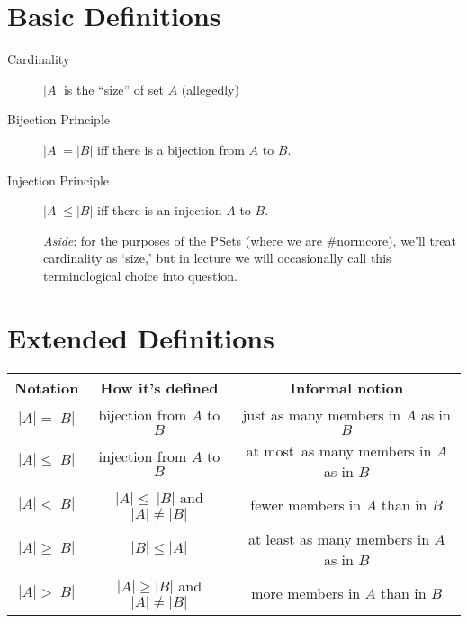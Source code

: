 \documentclass[12pt]{extarticle}
\begin{document}



\vspace{-15mm}

\section{Basic Definitions}

\begin{description}
\item[Cardinality] $|A|$ is the ``size'' of set $A$ (allegedly)

\item[Bijection Principle]
$|A| = |B|$ iff there is a bijection from $A$ to $B$.

\item[Injection Principle]
$|A| \leq |B|$ iff there is an injection $A$ to $B$.

\textit{Aside}: for the purposes of the PSets (where we are \#normcore), we'll treat cardinality as `size,' but in lecture we will occasionally call this terminological choice into question. 

\end{description}



\section{Extended Definitions}



\begin{center}
\begin{tabular}{ccc} \hline
\textbf{Notation} &  \textbf{How it's defined} & \textbf{Informal notion}  \\ \hline
$|A| = |B|$ &  {\small bijection from $A$ to $B$} & {\small just as many members in $A$ as in $B$}  \\ \hline
 $|A| \leq |B|$ & {\small injection from $A$ to $B$} & {\small at most~as many members in $A$ as in $B$}\\
$|A| < |B|$ & {\small $|A| \leq~|B|$ and $|A| \neq |B|$} & {\small fewer members in $A$ than in $B$} \\ \hline
$|A| \geq |B|$ &  {\small $|B| \leq |A|$} & {\small at least as many members in $A$ as in $B$} \\
$|A| > |B|$ & {\small $|A| \geq |B|$ and $|A| \neq |B|$} & {\small more members in $A$ than in $B$}\\
\hline
\end{tabular}
\end{center}
\end{document}
